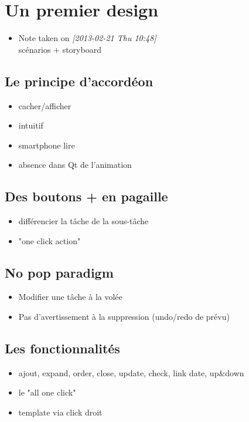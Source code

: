 \documentclass[11pt]{article}
\begin{document}
\section{Un premier design}
\begin{itemize}
\item Note taken on \textit{[2013-02-21 Thu 10:48]} \\
  scénarios + storyboard
\end{itemize}


\subsection{Le principe d'accordéon}
\begin{itemize}
\item cacher/afficher
\item intuitif
\item smartphone lire
\item absence dans Qt de l'animation
\end{itemize}


\subsection{Des boutons + en pagaille}
\begin{itemize}
\item différencier la tâche de la sous-tâche
\item "one click action"
\end{itemize}


\subsection{No pop paradigm}
\begin{itemize}
\item Modifier une tâche à la volée
\item Pas d'avertissement à la suppression (undo/redo de prévu)
\end{itemize}


\subsection{Les fonctionnalités}
\begin{itemize}
\item ajout, expand, order, close, update, check, link date, up\&down
\item le "all one click"
\item template via click droit
\end{itemize}
\end{document}
